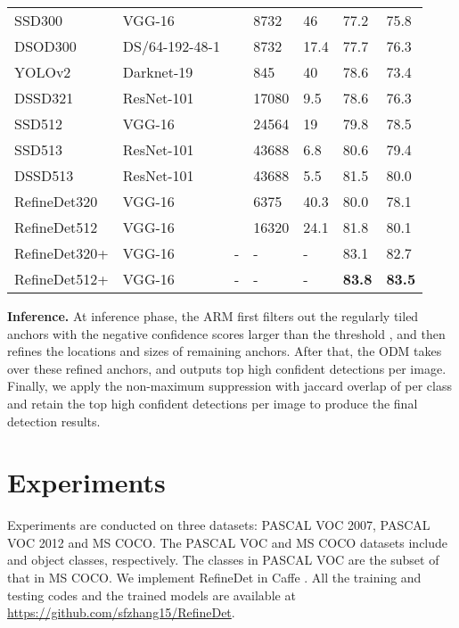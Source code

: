 \documentclass[10pt,twocolumn,letterpaper]{article}
\begin{document}
\begin{table*}[t]
\begin{tabular}{p{3.0cm}<{\centering}|p{3.0cm}<{\centering}|p{2.5cm}<{\centering}|p{1.5cm}<{\centering}|p{1.5cm}<{\centering}|p{2.2cm}<{\centering}|p{2.2cm}<{\centering}}
SSD300\cite{DBLP:conf/eccv/LiuAESRFB16} &VGG-16 & &8732 &46 &77.2 &75.8\\
DSOD300\cite{DBLP:conf/iccv/abs-1708-01241} &DS/64-192-48-1 & &8732 &17.4 &77.7 &76.3\\
YOLOv2\cite{DBLP:journals/corr/RedmonF16}   &Darknet-19 & &845 &40 &78.6 &73.4\\
DSSD321\cite{DBLP:journals/corr/FuLRTB17}   &ResNet-101 & &17080 &9.5 &78.6 &76.3\\
SSD512\cite{DBLP:conf/eccv/LiuAESRFB16} &VGG-16 & &24564 &19 &79.8 &78.5\\
SSD513\cite{DBLP:journals/corr/FuLRTB17}    &ResNet-101 & &43688 &6.8 &80.6 &79.4\\
DSSD513\cite{DBLP:journals/corr/FuLRTB17}   &ResNet-101 & &43688 &5.5 &81.5 &80.0\\
\hline
RefineDet320    &VGG-16     & &6375  &40.3 &80.0 &78.1\\
RefineDet512    &VGG-16     & &16320 &24.1 &81.8 &80.1\\
RefineDet320+   &VGG-16     &-  &- &- &83.1 &82.7\\
RefineDet512+   &VGG-16     &-  &- &- &{\bf 83.8} &{\bf 83.5}\\
\bottomrule[1.5pt]
\end{tabular}
\label{tab:pascal-voc}
\end{table*}


{\noindent \textbf{Inference.}}
At inference phase, the ARM first filters out the regularly tiled anchors with the negative confidence scores larger than the threshold , and then refines the locations and sizes of remaining anchors. After that, the ODM takes over these refined anchors, and outputs top  high confident detections per image. Finally, we apply the non-maximum suppression with jaccard overlap of  per class and retain the top  high confident detections per image to produce the final detection results.

\section{Experiments}
Experiments are conducted on three datasets: PASCAL VOC 2007, PASCAL VOC 2012 and MS COCO. The PASCAL VOC and MS COCO datasets include  and  object classes, respectively. The classes in PASCAL VOC are the subset of that in MS COCO. We implement RefineDet in Caffe \cite{DBLP:conf/mm/JiaSDKLGGD14}. All the training and testing codes and the trained models are available at \url{https://github.com/sfzhang15/RefineDet}.
\end{document}
